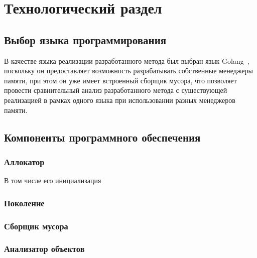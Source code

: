 \chapter{Технологический раздел}



\section{Выбор языка программирования}

В качестве языка реализации разработанного метода был выбран язык Golang~\cite{golang}, поскольку он предоставляет возможность разрабатывать собственные менеджеры памяти, при этом он уже имеет встроенный сборщик мусора, что позволяет провести сравнительный анализ разработанного метода с существующей реализацией в рамках одного языка при использовании разных менеджеров памяти.


\section{Компоненты программного обеспечения}

\subsection{Аллокатор}

В том числе его инициализация

\subsection{Поколение}

\subsection{Сборщик мусора}

\subsection{Анализатор объектов}

